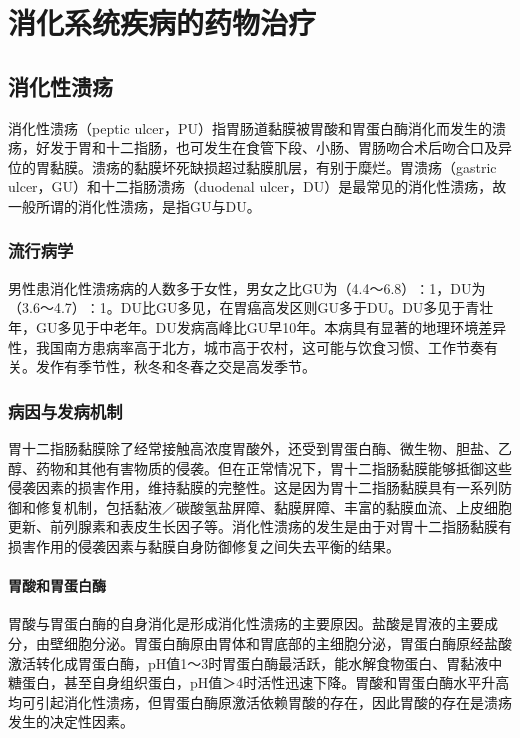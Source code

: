 \chapter{消化系统疾病的药物治疗}

\section{消化性溃疡}

消化性溃疡（peptic
ulcer，PU）指胃肠道黏膜被胃酸和胃蛋白酶消化而发生的溃疡，好发于胃和十二指肠，也可发生在食管下段、小肠、胃肠吻合术后吻合口及异位的胃黏膜。溃疡的黏膜坏死缺损超过黏膜肌层，有别于糜烂。胃溃疡（gastric
ulcer，GU）和十二指肠溃疡（duodenal
ulcer，DU）是最常见的消化性溃疡，故一般所谓的消化性溃疡，是指GU与DU。

\subsection{流行病学}

男性患消化性溃疡病的人数多于女性，男女之比GU为（4.4～6.8）∶1，DU为（3.6～4.7）∶1。DU比GU多见，在胃癌高发区则GU多于DU。DU多见于青壮年，GU多见于中老年。DU发病高峰比GU早10年。本病具有显著的地理环境差异性，我国南方患病率高于北方，城市高于农村，这可能与饮食习惯、工作节奏有关。发作有季节性，秋冬和冬春之交是高发季节。

\subsection{病因与发病机制}

胃十二指肠黏膜除了经常接触高浓度胃酸外，还受到胃蛋白酶、微生物、胆盐、乙醇、药物和其他有害物质的侵袭。但在正常情况下，胃十二指肠黏膜能够抵御这些侵袭因素的损害作用，维持黏膜的完整性。这是因为胃十二指肠黏膜具有一系列防御和修复机制，包括黏液／碳酸氢盐屏障、黏膜屏障、丰富的黏膜血流、上皮细胞更新、前列腺素和表皮生长因子等。消化性溃疡的发生是由于对胃十二指肠黏膜有损害作用的侵袭因素与黏膜自身防御修复之间失去平衡的结果。

\subsubsection{胃酸和胃蛋白酶}

胃酸与胃蛋白酶的自身消化是形成消化性溃疡的主要原因。盐酸是胃液的主要成分，由壁细胞分泌。胃蛋白酶原由胃体和胃底部的主细胞分泌，胃蛋白酶原经盐酸激活转化成胃蛋白酶，pH值1～3时胃蛋白酶最活跃，能水解食物蛋白、胃黏液中糖蛋白，甚至自身组织蛋白，pH值＞4时活性迅速下降。胃酸和胃蛋白酶水平升高均可引起消化性溃疡，但胃蛋白酶原激活依赖胃酸的存在，因此胃酸的存在是溃疡发生的决定性因素。

